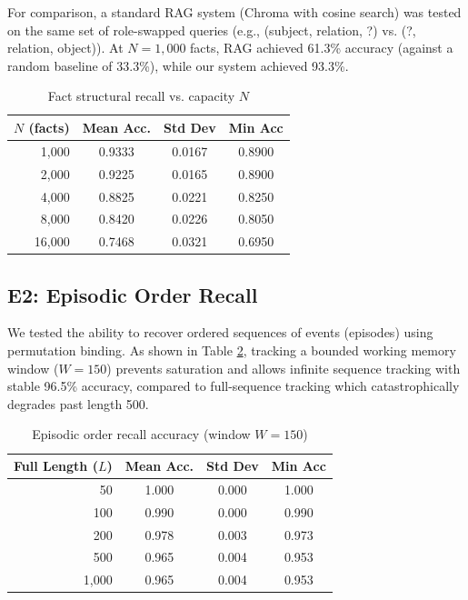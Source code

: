 \documentclass[11pt,letterpaper]{article}
\begin{document}
For comparison, a standard RAG system (Chroma with cosine search) was tested on the same set of role-swapped queries (e.g., (subject, relation, ?) vs. (?, relation, object)). At $N=1,000$ facts, RAG achieved 61.3\% accuracy (against a random baseline of 33.3\%), while our system achieved 93.3\%.

\begin{table}[h]
\centering
\caption{Fact structural recall vs. capacity $N$}
\label{tab:capacity}
\begin{tabular}{rccc}
\toprule
$N$ (facts) & Mean Acc. & Std Dev & Min Acc \\
\midrule
1,000  & 0.9333 & 0.0167 & 0.8900 \\
2,000  & 0.9225 & 0.0165 & 0.8900 \\
4,000  & 0.8825 & 0.0221 & 0.8250 \\
8,000  & 0.8420 & 0.0226 & 0.8050 \\
16,000 & 0.7468 & 0.0321 & 0.6950 \\
\bottomrule
\end{tabular}
\end{table}

\subsection{E2: Episodic Order Recall}
We tested the ability to recover ordered sequences of events (episodes) using permutation binding. As shown in Table \ref{tab:episode}, tracking a bounded working memory window ($W=150$) prevents saturation and allows infinite sequence tracking with stable 96.5\% accuracy, compared to full-sequence tracking which catastrophically degrades past length 500.

\begin{table}[h]
\centering
\caption{Episodic order recall accuracy (window $W=150$)}
\label{tab:episode}
\begin{tabular}{rccc}
\toprule
Full Length ($L$) & Mean Acc. & Std Dev & Min Acc \\
\midrule
50 & 1.000 & 0.000 & 1.000 \\
100 & 0.990 & 0.000 & 0.990 \\
200 & 0.978 & 0.003 & 0.973 \\
500 & 0.965 & 0.004 & 0.953 \\
1,000 & 0.965 & 0.004 & 0.953 \\
\bottomrule
\end{tabular}
\end{table}
\end{document}
